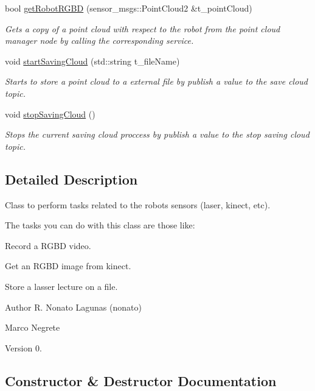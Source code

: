 \begin{DoxyCompactItemize}
bool \hyperlink{class_sensors_tasks_a55edd615fa344fd80ab03bb2bdfff1be}{get\+Robot\+R\+G\+BD} (sensor\+\_\+msgs\+::\+Point\+Cloud2 \&t\+\_\+point\+Cloud)
\begin{DoxyCompactList}\small\item\em Gets a copy of a point cloud with respect to the robot from the point cloud manager node by calling the corresponding service. \end{DoxyCompactList}\item 
void \hyperlink{class_sensors_tasks_a659aa197ecaa974a071ee42f33d224fa}{start\+Saving\+Cloud} (std\+::string t\+\_\+file\+Name)
\begin{DoxyCompactList}\small\item\em Starts to store a point cloud to a external file by publish a value to the save cloud topic. \end{DoxyCompactList}\item 
void \hyperlink{class_sensors_tasks_a18dfe16fa45180c91e16e5cf7b7bb174}{stop\+Saving\+Cloud} ()
\begin{DoxyCompactList}\small\item\em Stops the current saving cloud proccess by publish a value to the stop saving cloud topic. \end{DoxyCompactList}\end{DoxyCompactItemize}


\subsection{Detailed Description}
Class to perform tasks related to the robot\textquotesingle{}s sensors (laser, kinect, etc). 

The tasks you can do with this class are those like\+:
\begin{DoxyItemize}
\item Record a R\+G\+BD video.
\item Get an R\+G\+BD image from kinect.
\item Store a lasser lecture on a file.
\end{DoxyItemize}

\begin{DoxyAuthor}{Author}
R. Nonato Lagunas (nonato) 

Marco Negrete 
\end{DoxyAuthor}
\begin{DoxyVersion}{Version}
0. 
\end{DoxyVersion}


\subsection{Constructor \& Destructor Documentation}
